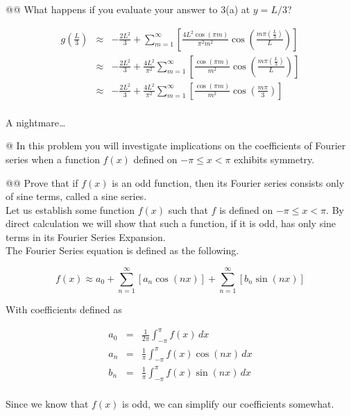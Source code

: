 \documentclass[10pt]{article}
\begin{document}
\begin{easylist}[enumerate]
    @@ What happens if you evaluate your answer to 3(a) at $y=L/3$?

    \begin{align*}
        g\left(\frac{L}{3}\right) &\approx& -\frac{2 L^2}{3} + \sum_{m=1}^\infty \left[ \frac{4 L^2 \cos (\pi  m)}{\pi^2 m^2} \cos \left( \frac{m \pi {\left(\frac{L}{3}\right)}}{L} \right) \right]\\
        &\approx& -\frac{2 L^2}{3} + \frac{4L^2}{\pi^2} \sum_{m=1}^\infty \left[ \frac{\cos (\pi  m)}{m^2} \cos \left( \frac{m \pi {\left(\frac{L}{3}\right)}}{L} \right) \right]\\
        &\approx& -\frac{2 L^2}{3} + \frac{4L^2}{\pi^2} \sum_{m=1}^\infty \left[ \frac{\cos (\pi  m)}{m^2} \cos \left( \frac{m \pi}{3} \right) \right]\\
    \end{align*}

    A nightmare\ldots

    \newpage
    @ In this problem you will investigate implications on the coefficients of Fourier series when a function $f(x)$
    defined on $-\pi \le x < \pi$ exhibits symmetry.

    @@ Prove that if $f(x)$ is an odd function, then its Fourier series consists only of sine terms, called a sine
    series.\\

    Let us establish some function $f(x)$ such that $f$ is defined on $-\pi \le x < \pi$. By direct calculation we will
    show that such a function, if it is odd, has only sine terms in its Fourier Series Expansion.\\

    The Fourier Series equation is defined as the following.

    \[
        f(x) \approx a_0 + \sum_{n=1}^\infty \left[ a_n \cos(nx) \right] + \sum_{n=1}^\infty \left[ b_n \sin(nx) \right]
    \]

    With coefficients defined as

    \begin{align*}
        a_0 &=& \frac{1}{2 \pi} \int_{-\pi}^\pi f(x) \, dx\\
        a_n &=& \frac{1}{\pi} \int_{-\pi}^\pi f(x) \cos(nx) \, dx\\
        b_n &=& \frac{1}{\pi} \int_{-\pi}^\pi f(x) \sin(nx) \, dx\\
    \end{align*}

    Since we know that $f(x)$ is odd, we can simplify our coefficients somewhat.


\end{easylist}
\end{document}
